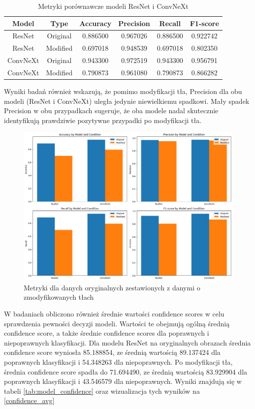 \begin{table}
	\centering
	\begin{tabular}{|c|c|c|c|c|c|}
		\hline
		\textbf{Model} & \textbf{Type} & \textbf{Accuracy} & \textbf{Precision} & \textbf{Recall} & \textbf{F1-score} \\
		\hline
		ResNet & Original & 0.886500 & 0.967026 & 0.886500 & 0.922742 \\
		\hline
		ResNet & Modified & 0.697018 & 0.948539 & 0.697018 & 0.802350 \\
		\hline
		ConvNeXt & Original & 0.943300 & 0.972519 & 0.943300 & 0.956791 \\
		\hline
		ConvNeXt & Modified & 0.790873 & 0.961080 & 0.790873 & 0.866282 \\
		\hline
	\end{tabular}
	\caption{Metryki porównawcze modeli ResNet i ConvNeXt}
	\label{tab:model_comparison_metrics}
\end{table}

Wyniki badań również wskazują, że pomimo modyfikacji tła, Precision dla obu modeli (ResNet i ConvNeXt) uległa jedynie niewielkiemu spadkowi. Mały spadek Precision w obu przypadkach sugeruje, że oba modele nadal skutecznie identyfikują 
prawdziwie pozytywne przypadki po modyfikacji tła.

\begin{figure}
	\centering\includegraphics[width=.9\textwidth]{img/overall_metrics}
	\caption{Metryki dla danych oryginalnych zestawionych z danymi o zmodyfikowanych tłach}  
    \label{rys:overall_metrics}
\end{figure}


W badaniach obliczono również średnie wartości confidence scores w celu sprawdzenia pewności decyzji modeli. Wartości te obejmują ogólną średnią confidence score, a także średnie confidence scores dla poprawnych i niepoprawnych klasyfikacji. 
Dla modelu ResNet na oryginalnych obrazach średnia confidence score wyniosła 85.188854, ze średnią wartością 89.137424 dla poprawnych klasyfikacji i 54.348263 dla niepoprawnych. Po 
modyfikacji tła, średnia confidence score spadła do 71.694490, ze średnią wartością 83.929904 dla poprawnych klasyfikacji i 43.546579 dla niepoprawnych. Wyniki znajdują się w tabeli \ref*{tab:model_confidence} oraz wizualizacja tych wyników na 
\ref*{confidence_avg}

